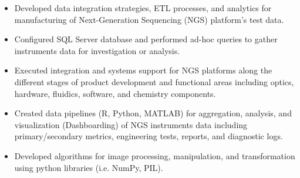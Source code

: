 \documentclass[10pt,a4paper]{altacv}
\begin{document}
\tagline{}

%

\begin{fullwidth}
\makecvheader
\end{fullwidth}

%





\begin{itemize}
    \item   \small{Developed data integration strategies, ETL processes, and analytics for manufacturing of Next-Generation Sequencing (NGS) platform's test data.}
    \item   \small{Configured SQL Server database and performed ad-hoc queries to gather instruments data for investigation or analysis.}

\end{itemize}

\medskip



\begin{itemize}
    \item   \small{Executed integration and systems support for NGS platforms along the different stages of product development and functional areas including optics, hardware, fluidics, software, and chemistry components.}
    \item   \small{Created data pipelines (R, Python, MATLAB) for aggregation, analysis, and visualization (Dashboarding) of NGS instruments data including primary/secondary metrics, engineering tests, reports, and diagnostic logs.}
    \item   \small{Developed algorithms for image processing, manipulation, and transformation using python libraries (i.e. NumPy, PIL).}
\end{itemize}
\end{document}
